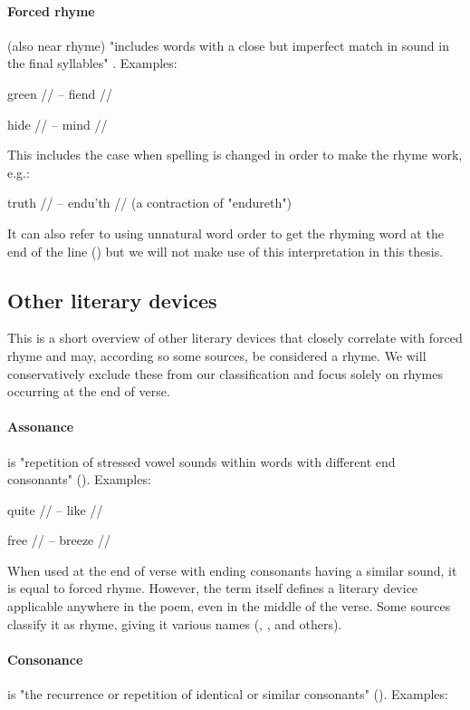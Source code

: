 \paragraph{Forced rhyme} (also near rhyme) "includes words with a close but imperfect match in sound in the final syllables" \cite{bergman2017litcharts}. Examples: 

green // -- fiend //

hide // -- mind //

\noindent This includes the case when spelling is changed in order to make the rhyme work, e.g.:

 truth // -- endu'th // (a contraction of "endureth")
 
 It can also refer to using unnatural word order to get the rhyming word at the end of the line (\cite{bergman2017litcharts}) but we will not make use of this interpretation in this thesis.

\subsection{Other literary devices}
This is a short overview of other literary devices that closely correlate with forced rhyme and may, according so some sources, be considered a rhyme. We will conservatively exclude these from our classification and focus solely on rhymes occurring at the end of verse.

\paragraph{Assonance} is "repetition of stressed vowel sounds within words with different end consonants" (\cite{britannica}). Examples:	

quite // -- like //

free // -- breeze //

\noindent When used at the end of verse with ending consonants having a similar sound, it is equal to forced rhyme. However, the term itself defines a literary device applicable anywhere in the poem, even in the middle of the verse. Some sources classify it as rhyme, giving it various names (\cite{vanphonological}, \cite{bergman2017litcharts}, and others).

\paragraph{Consonance} is "the recurrence or repetition of identical or similar consonants" (\cite{britannica}). Examples: 

